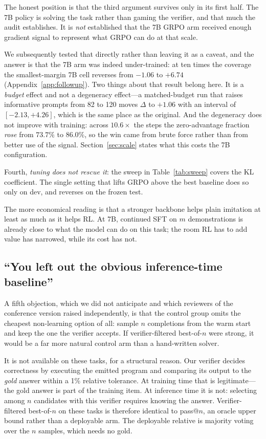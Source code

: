 The honest position is that the third argument survives only in its first half.
The 7B policy is solving the task rather than gaming the verifier, and that
much the audit establishes. It is \emph{not} established that the 7B GRPO arm
received enough gradient signal to represent what GRPO can do at that scale.

We subsequently tested that directly rather than leaving it as a caveat, and the
answer is that the 7B arm was indeed under-trained: at ten times the coverage
the smallest-margin 7B cell reverses from $-1.06$ to $+6.74$
(Appendix~\ref{app:followup}). Two things about that result belong here. It is a
\emph{budget} effect and not a degeneracy effect---a matched-budget run that
raises informative prompts from 82 to 120 moves $\Delta$ to $+1.06$ with an
interval of $[-2.13,+4.26]$, which is the same place as the original. And the
degeneracy does not improve with training: across $10.6\times$ the steps the
zero-advantage fraction \emph{rose} from $73.7\%$ to $86.0\%$, so the win came
from brute force rather than from better use of the signal. Section~\ref{sec:scale}
states what this costs the 7B configuration.

Fourth, \emph{tuning does not rescue it}: the sweep in
Table~\ref{tab:sweep} covers the KL coefficient. The
single setting that lifts GRPO above the best baseline does so only on dev, and
reverses on the frozen test.

The more economical reading is that a stronger backbone helps plain imitation
at least as much as it helps RL. At 7B, continued SFT on $m$ demonstrations is
already close to what the model can do on this task; the room RL has to add
value has narrowed, while its cost has not.

\subsection{``You left out the obvious inference-time baseline''}
\label{subsec:bon}

A fifth objection, which we did not anticipate and which reviewers of the
conference version raised independently, is that the control group omits the
cheapest non-learning option of all: sample $n$ completions from the warm start
and keep the one the verifier accepts. If verifier-filtered best-of-$n$ were
strong, it would be a far more natural control arm than a hand-written solver.

It is not available on these tasks, for a structural reason. Our verifier
decides correctness by executing the emitted program and comparing its output
to the \emph{gold} answer within a 1\% relative tolerance. At training time
that is legitimate---the gold answer is part of the training item. At inference
time it is not: selecting among $n$ candidates with this verifier requires
knowing the answer. Verifier-filtered best-of-$n$ on these tasks is therefore
identical to pass@$n$, an oracle upper bound rather than a deployable arm. The
deployable relative is majority voting over the $n$ samples, which needs no gold.

